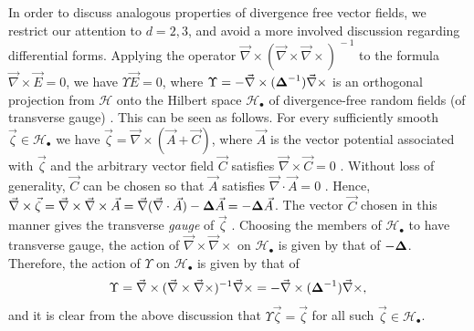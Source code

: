 \documentclass[11pt]{amsart}
\newcommand\bDelta{\mbox{\boldmath${\Delta}$}}
\begin{document}
In order to discuss analogous properties of divergence free vector
fields, we restrict our attention to $d=2,3$, and avoid a more involved
discussion regarding differential forms. Applying the operator 
$\vec{\nabla}\times(\vec{\nabla}\times\vec{\nabla}\times)^{\,-1}$ to the formula
$\vec{\nabla}\times\vec{E}=0$, we have $\Upsilon\vec{E}=0$, where  
$\Upsilon=-\vec{\nabla}\times(\bDelta^{-1})\vec{\nabla}\times$ is an orthogonal projection from
$\mathscr{H}$ onto the Hilbert space $\mathscr{H}_{\bullet}$ of
divergence-free random fields (of transverse gauge)
\cite{Murphy:JMP:063506}. This can be seen as follows. For every
sufficiently smooth $\vec{\zeta}\in\mathscr{H}_\bullet$ we have
$\vec{\zeta}=\vec{\nabla}\times(\vec{A}+\vec{C})$, where $\vec{A}$ is the vector
potential associated with $\vec{\zeta}$ and the arbitrary vector field
$\vec{C}$ satisfies $\vec{\nabla}\times\vec{C}=0$ \cite{Jackson-1999}. Without
loss of generality, $\vec{C}$ can be chosen so that $\vec{A}$
satisfies $\vec{\nabla}\cdot\vec{A}=0$ \cite{Jackson-1999}. Hence,
$\vec{\nabla}\times\vec{\zeta}=\vec{\nabla}\times\vec{\nabla}\times\vec{A}
=\vec{\nabla}(\vec{\nabla}\cdot\vec{A})-\bDelta\vec{A}=-\bDelta\vec{A}$. The vector
$\vec{C}$ chosen in this manner gives the transverse \emph{gauge} of
$\vec{\zeta}$ \cite{Jackson-1999}. Choosing the members of
$\mathscr{H}_\bullet$ to have transverse gauge, the action of
$\vec{\nabla}\times\vec{\nabla}\times$ on $\mathscr{H}_\bullet$ is given by that of 
$-\bDelta$. Therefore, the action of $\Upsilon$ on $\mathscr{H}_\bullet$ is given
by that of 
%
\begin{align}\label{eq:GammaCurl}
  \Upsilon=\vec{\nabla}\times(\vec{\nabla}\times\vec{\nabla}\times)^{-1}\vec{\nabla}\times
  =-\vec{\nabla}\times(\bDelta^{-1})\vec{\nabla}\times, 
\end{align}
%
and it is clear from the above discussion that $\Upsilon\vec{\zeta}=\vec{\zeta}$ for
all such $\vec{\zeta}\in\mathscr{H}_\bullet$.
\end{document}
